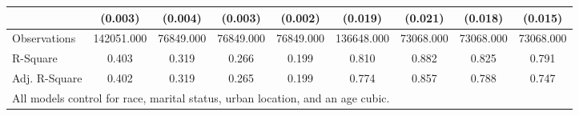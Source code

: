 \documentclass[border=3mm,preview]{standalone}
\begin{document}
\begin{landscape}
\begin{table}
\begin{tabular}{l*{8}{c}}
                    &     (0.003)         &     (0.004)         &     (0.003)         &     (0.002)         &     (0.019)         &     (0.021)         &     (0.018)         &     (0.015)         \\
\bottomrule
Observations        &  142051.000         &   76849.000         &   76849.000         &   76849.000         &  136648.000         &   73068.000         &   73068.000         &   73068.000         \\
R-Square            &       0.403         &       0.319         &       0.266         &       0.199         &       0.810         &       0.882         &       0.825         &       0.791         \\
Adj. R-Square       &       0.402         &       0.319         &       0.265         &       0.199         &       0.774         &       0.857         &       0.788         &       0.747         \\
\bottomrule
\multicolumn{9}{l}{\small{All models control for race, marital status, urban location, and an age cubic.}} \\
\end{tabular}
\end{table}
\end{landscape}
\end{document}
